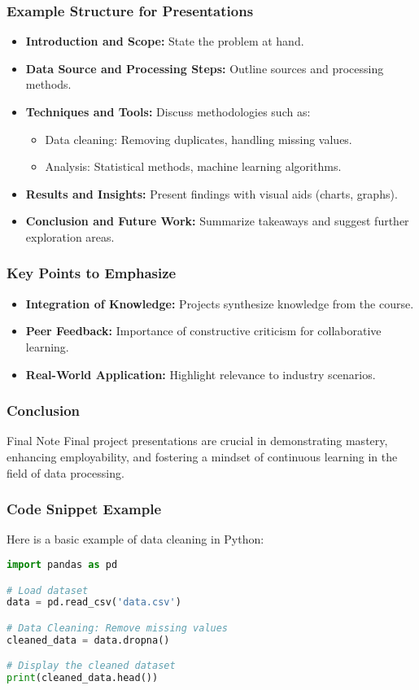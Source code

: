 \documentclass[aspectratio=169]{beamer}
\begin{document}
\begin{frame}[fragile]
    \frametitle{Example Structure for Presentations}
    \begin{itemize}
        \item \textbf{Introduction and Scope:} State the problem at hand.
        \item \textbf{Data Source and Processing Steps:} Outline sources and processing methods.
        \item \textbf{Techniques and Tools:} Discuss methodologies such as:
        \begin{itemize}
            \item Data cleaning: Removing duplicates, handling missing values.
            \item Analysis: Statistical methods, machine learning algorithms.
        \end{itemize}
        \item \textbf{Results and Insights:} Present findings with visual aids (charts, graphs).
        \item \textbf{Conclusion and Future Work:} Summarize takeaways and suggest further exploration areas.
    \end{itemize}
\end{frame}

\begin{frame}[fragile]
    \frametitle{Key Points to Emphasize}
    \begin{itemize}
        \item \textbf{Integration of Knowledge:} Projects synthesize knowledge from the course.
        \item \textbf{Peer Feedback:} Importance of constructive criticism for collaborative learning.
        \item \textbf{Real-World Application:} Highlight relevance to industry scenarios.
    \end{itemize}
\end{frame}

\begin{frame}[fragile]
    \frametitle{Conclusion}
    \begin{block}{Final Note}
        Final project presentations are crucial in demonstrating mastery, enhancing employability, and fostering a mindset of continuous learning in the field of data processing.
    \end{block}
\end{frame}

\begin{frame}[fragile]
    \frametitle{Code Snippet Example}
    Here is a basic example of data cleaning in Python:
    \begin{lstlisting}[language=Python]
import pandas as pd

# Load dataset
data = pd.read_csv('data.csv')

# Data Cleaning: Remove missing values
cleaned_data = data.dropna()

# Display the cleaned dataset
print(cleaned_data.head())
    \end{lstlisting}
\end{frame}
\end{document}
